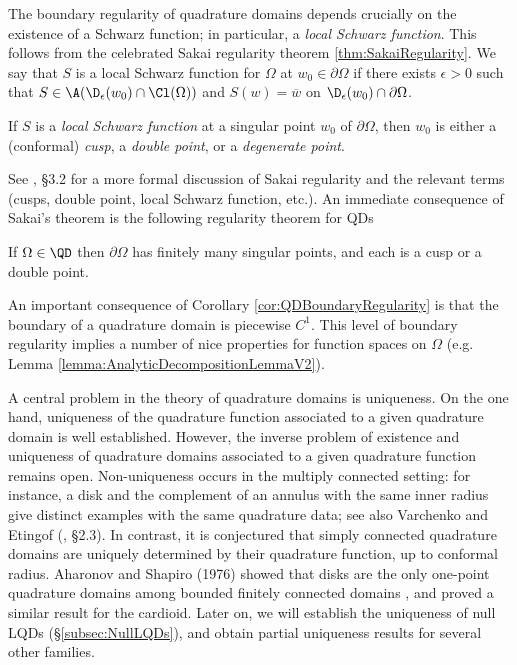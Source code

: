 \documentclass{article}
\numberwithin{equation}{section}
\begin{document}
The boundary regularity of quadrature domains depends crucially on the existence of a Schwarz function; in particular, a \emph{local Schwarz function}. This follows from the celebrated Sakai regularity theorem \ref{thm:SakaiRegularity}. We say that $S$ is a local Schwarz function for $\Omega$ at $w_0\in\partial\Omega$ if there exists $\epsilon>0$ such that $S\in\A(\D_\epsilon(w_0)\cap\Cl(\Omega))$ and $S(w)=\overline{w}$ on $\D_\epsilon(w_0)\cap\partial\Omega$.
\begin{theorem}\label{thm:SakaiRegularity}
    If $S$ is a {\it local Schwarz function} at a singular point $w_0$ of $\partial\Omega$, then $w_0$ is either a (conformal) {\it cusp}, a {\it double point}, or a {\it degenerate point}.
\end{theorem}
See \cite{Lee_2015}, \S3.2 for a more formal discussion of Sakai regularity and the relevant terms (cusps, double point, local Schwarz function, etc.). An immediate consequence of Sakai's theorem is the following regularity theorem for QDs
\begin{corollary}\label{cor:QDBoundaryRegularity}
    If $\Omega\in\QD$ then $\partial\Omega$ has finitely many singular points, and each is a cusp or a double point.
\end{corollary}
An important consequence of Corollary \ref{cor:QDBoundaryRegularity} is that the boundary of a quadrature domain is piecewise $C^1$. This level of boundary regularity implies a number of nice properties for function spaces on $\Omega$ (e.g. Lemma \ref{lemma:AnalyticDecompositionLemmaV2}).


A central problem in the theory of quadrature domains is uniqueness. On the one hand, uniqueness of the quadrature function associated to a given quadrature
domain is well established. However, the inverse problem of existence and uniqueness of quadrature domains
associated to a given quadrature function remains open. Non-uniqueness occurs in the multiply connected setting: for instance, a disk and the complement of an annulus with the same inner radius give distinct examples with the same quadrature data; see also Varchenko and Etingof (\cite{DropOrderFour}, \S2.3). In contrast, it is conjectured that simply connected quadrature domains are uniquely determined by their quadrature function, up to conformal radius. Aharonov and Shapiro (1976) showed that disks are the only one-point quadrature domains among bounded finitely connected domains \cite{AharonovShapiro}, and proved a similar result for the cardioid. Later on, we will establish the uniqueness of null LQDs (\S\ref{subsec:NullLQDs}), and obtain partial uniqueness results for several other families.
\end{document}
